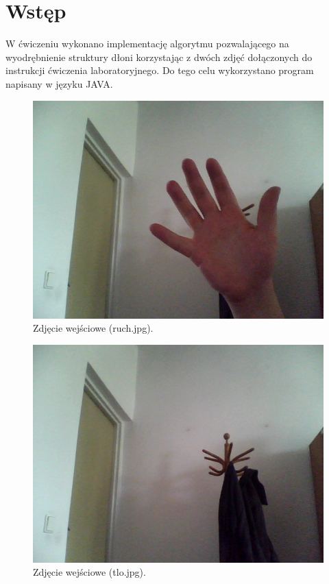 	
	\section{Wstęp}
	W ćwiczeniu wykonano implementację algorytmu pozwalającego na wyodrębnienie struktury dłoni korzystając z dwóch zdjęć dołączonych do instrukcji ćwiczenia laboratoryjnego. Do tego celu wykorzystano program napisany w języku JAVA.
		\begin{figure}[h!]
			\centering
				\includegraphics[width=1\textwidth]{./img/ruch.jpg}
			\caption{\label{fig:ruch}Zdjęcie wejściowe (ruch.jpg).}
		\end{figure}
				\begin{figure}[h!]
					\centering
					\includegraphics[width=1\textwidth]{./img/tlo.jpg}
					\caption{\label{fig:ruch1}Zdjęcie wejściowe (tlo.jpg).}
				\end{figure}
				
